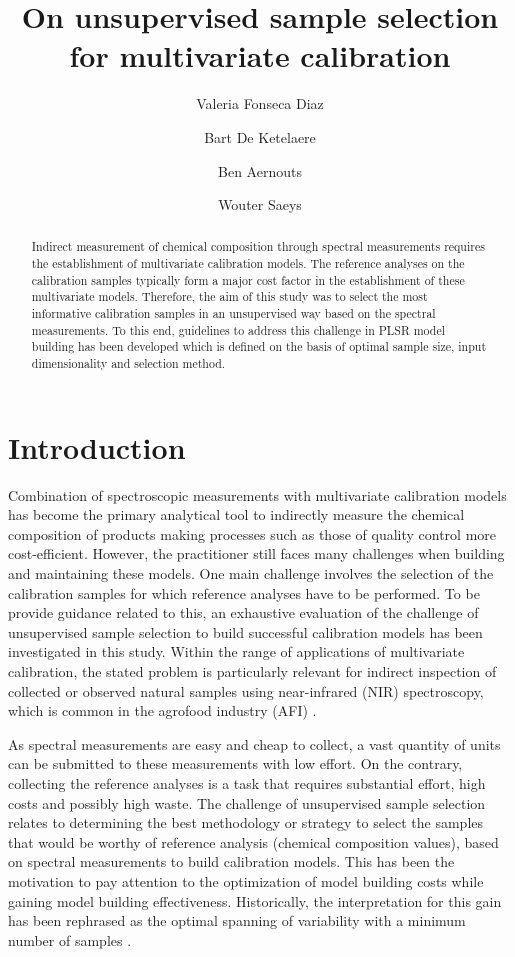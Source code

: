 \documentclass[journal=ancham,manuscript=article]{achemso}
\author{Valeria Fonseca Diaz}
\author{Bart De Ketelaere}
\author{Ben Aernouts}
\author{Wouter Saeys}
\affiliation[KU Leuven]
{KU Leuven, Kasteelpark
Arenberg 30, Leuven, Belgium}
\title[An \textsf{achemso} demo]
  {On unsupervised sample selection for multivariate calibration}
\begin{document}
\begin{abstract}
Indirect measurement of chemical composition through spectral measurements requires the establishment of multivariate calibration models. The reference analyses on the calibration samples typically form a major cost factor in the establishment of these multivariate models. Therefore, the aim of this study was to select the most informative calibration samples in an unsupervised way based on the spectral measurements. To this end, guidelines to address this challenge in PLSR model building has been developed which is defined on the basis of optimal sample size, input dimensionality and selection method. 

\end{abstract}%


\section{Introduction}\label{introduction}

Combination of spectroscopic measurements with multivariate calibration models has become the primary analytical tool to indirectly measure the chemical composition of products making processes such as those of quality control more cost-efficient. However, the practitioner still faces many challenges when building and maintaining these models. One main challenge involves the selection of the calibration samples for which reference analyses have to be performed. To be provide guidance related to this, an exhaustive evaluation of the challenge of unsupervised sample selection to build successful calibration models has been investigated in this study. Within the range of applications of multivariate calibration, the stated problem is particularly relevant for indirect inspection of collected or observed natural samples using near-infrared (NIR) spectroscopy, which is common in the agrofood industry (AFI) \cite{Au2020,Diaz-Olivares2020, Saeys2005, Bobelyn2010}.  

As spectral measurements are easy and cheap to collect, a vast quantity of units can be submitted to these measurements with low effort. On the contrary, collecting the reference analyses is a task that requires substantial effort, high costs and possibly high waste. The challenge of unsupervised sample selection relates to determining the best methodology or strategy to select the samples that would be worthy of reference analysis (chemical composition values), based on spectral measurements to build calibration models.
This has been the motivation to pay attention to the optimization of model building costs while gaining model building effectiveness. Historically, the interpretation for this gain has been rephrased as the optimal spanning of variability with a minimum number of samples \cite{Naes1990, Saeys2019,Kennard1969}.
\end{document}

